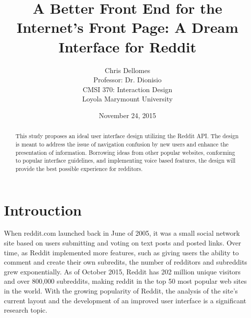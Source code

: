\documentclass{article}
\begin{document}
\title{A Better Front End for the Internet's Front Page: A Dream Interface for Reddit}
\author{Chris Dellomes\\
Professor: Dr. Dionisio\\
CMSI 370: Interaction Design\\
	Loyola Marymount University}

\date{November 24, 2015}

\maketitle

\begin{center}
\begin{abstract}
\noindent This study proposes an ideal user interface design utilizing the Reddit API. The design is meant to address the issue of navigation confusion by new users and enhance the presentation of information. Borrowing ideas from other popular websites, conforming to popular interface guidelines, and implementing voice based features, the design will provide the best possible experience for redditors.
\end{abstract}
\end{center}

\thispagestyle{empty}

\clearpage

\setcounter{page}{1}

\section{Introuction} When reddit.com launched back in June of 2005, it was a small social network site based on users submitting and voting on text posts and posted links. Over time, as Reddit implemented more features, such as giving users the ability to comment and create their own subredits, the number of redditors and subreddits grew exponentially. As of October 2015, Reddit has 202 million unique visitors and over 800,000 subreddits, making reddit in the top 50 most popular web sites in the world. With the growing popularity of Reddit, the analysis of the site's current layout and the development of an improved user interface is a significant research topic.
\end{document}

